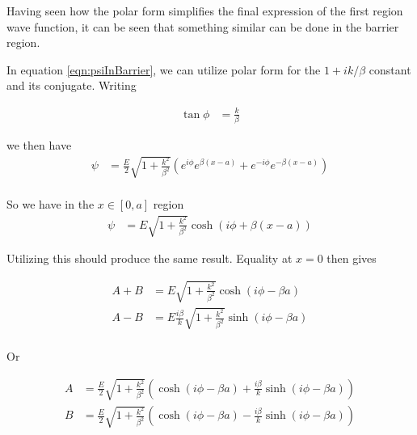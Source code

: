 \documentclass{article}
\begin{document}
Having seen how the polar form simplifies the final expression of the first region wave function, it can be seen that 
something similar can be done in the barrier region.  

In equation \ref{eqn:psiInBarrier}, we can utilize polar form for the $1+ik/\beta$ constant and its conjugate.  Writing

\begin{align*}
\tan\phi &= \frac{k}{\beta}
\end{align*}

we then have
\begin{align*}
\psi 
&=
\frac{E}{2}\sqrt{1 + \frac{k^2}{\beta^2}} \left( e^{i\phi} e^{ \beta(x-a)} + e^{-i\phi} e^{ -\beta(x-a)} \right) \\
\end{align*}

So we have in the $x \in [0,a]$ region
\begin{align}
\psi &= E \sqrt{1 + \frac{k^2}{\beta^2}} \cosh\left( i\phi + \beta(x-a) \right) 
\end{align}

Utilizing this should produce the same result.  Equality at $x=0$ then gives

\begin{align*}
A + B &= E \sqrt{1 + \frac{k^2}{\beta^2}} \cosh\left( i\phi -\beta a \right) \\
A - B &= E \frac{i\beta}{k} \sqrt{1 + \frac{k^2}{\beta^2}} \sinh\left( i\phi -\beta a \right) \\
\end{align*}

Or

\begin{align*}
A &= \frac{E}{2} \sqrt{1 + \frac{k^2}{\beta^2}} \left(
\cosh\left( i\phi -\beta a \right) + \frac{i\beta}{k} \sinh\left( i\phi -\beta a \right) 
\right) \\
B &= \frac{E}{2} \sqrt{1 + \frac{k^2}{\beta^2}} \left(
\cosh\left( i\phi -\beta a \right) - \frac{i\beta}{k} \sinh\left( i\phi -\beta a \right) 
\right) \\
\end{align*}



\end{document}
